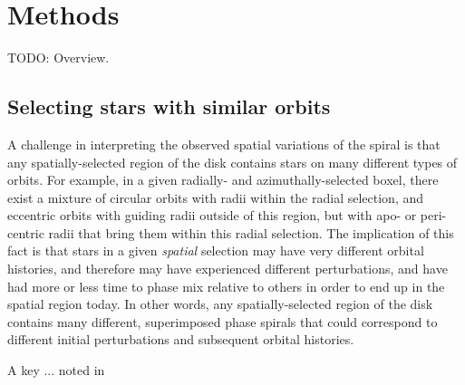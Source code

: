 

\section{Methods} \label{sec:methods}

TODO: Overview.

\subsection{Selecting stars with similar orbits}
\label{sec:methods-select-similar-orbit}

A challenge in interpreting the observed spatial variations of the spiral is that any spatially-selected region of the disk contains stars on many different types of orbits.
For example, in a given radially- and azimuthally-selected boxel, there exist a mixture of circular orbits with radii within the radial selection, and eccentric orbits with guiding radii outside of this region, but with apo- or peri-centric radii that bring them within this radial selection.
The implication of this fact is that stars in a given \emph{spatial} selection may have very different orbital histories, and therefore may have experienced different perturbations, and have had more or less time to phase mix relative to others in order to end up in the spatial region today.
In other words, any spatially-selected region of the disk contains many different, superimposed phase spirals that could correspond to different initial perturbations and subsequent orbital histories.

A key ... noted in \citep{LaporteXX}

